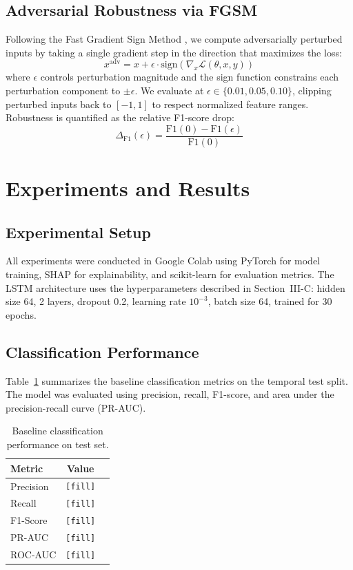 \documentclass[journal]{IEEEtran}
\begin{document}
\subsection{Adversarial Robustness via FGSM}
Following the Fast Gradient Sign Method \cite{goodfellow2015}, we compute adversarially perturbed inputs by taking a single gradient step in the direction that maximizes the loss:
\begin{equation}
    x^{\text{adv}} = x + \epsilon \cdot \text{sign}\left(\nabla_x \mathcal{L}(\theta, x, y)\right)
\end{equation}
where $\epsilon$ controls perturbation magnitude and the sign function constrains each perturbation component to $\pm\epsilon$. We evaluate at $\epsilon \in \{0.01, 0.05, 0.10\}$, clipping perturbed inputs back to $[-1, 1]$ to respect normalized feature ranges. Robustness is quantified as the relative F1-score drop:
\begin{equation}
    \Delta_{\text{F1}}(\epsilon) = \frac{\text{F1}(0) - \text{F1}(\epsilon)}{\text{F1}(0)}
\end{equation}

\section{Experiments and Results}
\subsection{Experimental Setup}
All experiments were conducted in Google Colab using PyTorch for model training, SHAP for explainability, and scikit-learn for evaluation metrics. The LSTM architecture uses the hyperparameters described in Section~III-C: hidden size 64, 2 layers, dropout 0.2, learning rate $10^{-3}$, batch size 64, trained for 30 epochs.

\subsection{Classification Performance}
Table~\ref{tab:results} summarizes the baseline classification metrics on the temporal test split. The model was evaluated using precision, recall, F1-score, and area under the precision-recall curve (PR-AUC).

\begin{table}[t]
\caption{Baseline classification performance on test set.}
\label{tab:results}
\centering
\begin{tabular}{lcc}
\toprule
\textbf{Metric} & \textbf{Value} \\
\midrule
Precision & \texttt{[fill]} \\
Recall & \texttt{[fill]} \\
F1-Score & \texttt{[fill]} \\
PR-AUC & \texttt{[fill]} \\
ROC-AUC & \texttt{[fill]} \\
\bottomrule
\end{tabular}
\end{table}
\end{document}
